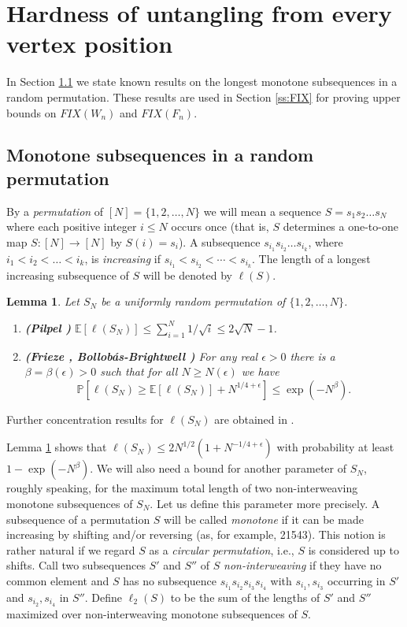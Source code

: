 \documentclass[reqno,12pt]{amsart}
\newtheorem{lemma}[theorem]{Lemma}
\newenvironment{bfenumerate}{\renewcommand{\labelenumi}{{\bf\theenumi.}}\renewcommand{\labelenumii}{{\bf(\theenumii)}}\begin{enumerate}}{\end{enumerate}}
\newcommand{\function}[2]{:#1 \rightarrow #2}
\newcommand{\of}[1]{\left( #1 \right)}
\newcommand{\EE}[1]{ {\mathbb E} \left[ #1 \right] }
\newcommand{\PP}[1]{ {\mathbb P} \left[ #1 \right] }
\newcommand{\FIX}[1]{\mathit{FIX}(#1)}
\begin{document}
\section{Hardness of untangling from every vertex position}\label{s:fixx}


In Section \ref{ss:monoton} we state known results on the longest monotone subsequences
in a random permutation. These results are used in Section \ref{ss:FIX} for
proving upper bounds on $\FIX{W_n}$ and $\FIX{F_n}$.

\subsection{Monotone subsequences in a random permutation}\label{ss:monoton}

By a \emph{permutation} of $[N]=\{1,2,\ldots,N\}$ we will mean a sequence
$S=s_1s_2\ldots s_N$
where each positive integer $i\le N$ occurs once (that is, $S$ determines a
one-to-one map $S\function{[N]}{[N]}$ by $S(i)=s_i$).
A subsequence $s_{i_1}s_{i_2}\ldots s_{i_k}$, where $i_1<i_2<\ldots<i_k$,
is \emph{increasing} if $s_{i_1}<s_{i_2}<\cdots<s_{i_k}$.
The length of a longest increasing subsequence of $S$ will be
denoted by $\ell(S)$. 

\begin{lemma}\label{lem:random}
Let $S_N$ be a uniformly random permutation of $\{1,2,\ldots,N\}$.

\noindent
\begin{bfenumerate}
\item \textbf{(Pilpel \cite{Pil})}
$
\EE{\ell(S_N)}\le\sum_{i=1}^N 1/\sqrt i\le2\sqrt N-1
$.

\smallskip

\item \textbf{(Frieze \cite{Fri}, Bollob\'as-Brightwell \cite{BBr})}
For any real $\epsilon>0$ there is a $\beta=\beta(\epsilon)>0$ such that
for all $N\ge N(\epsilon)$ we have
$$
\PP{\ell(S_N)\ge\EE{\ell(S_N)}+N^{1/4+\epsilon}}\le\exp\of{-N^\beta}.
$$
\end{bfenumerate}
\end{lemma}

\noindent
Further concentration results for $\ell(S_N)$ are obtained in \cite{Tal,BDJ}.

Lemma \ref{lem:random} shows that $\ell(S_N)\le2N^{1/2}(1+N^{-1/4+\epsilon})$
with probability at least $1-\exp\of{-N^\beta}$.
We will also need a bound for another parameter of $S_N$, roughly speaking, for
the maximum total length of two non-interweaving monotone subsequences of $S_N$.
Let us define this parameter more precisely.
A subsequence of a permutation $S$ will be called \emph{monotone} if it can 
be made increasing by shifting and/or reversing (as, for example, 21543). 
This notion is rather natural if we regard $S$ as a \emph{circular permutation}, 
i.e., $S$ is considered up to shifts.
Call two subsequences $S'$ and $S''$ of $S$ 
\emph{non-interweaving} if they have no common element and $S$ has no 
subsequence $s_{i_1}s_{i_2}s_{i_3}s_{i_4}$ with $s_{i_1},s_{i_3}$ occurring in $S'$ 
and $s_{i_2},s_{i_4}$ in $S''$. Define $\ell_2(S)$ to be the sum of 
the lengths of $S'$ and $S''$ maximized over non-interweaving monotone 
subsequences of $S$.
\end{document}
